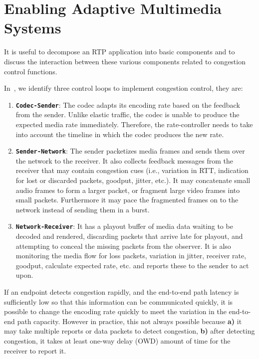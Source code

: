 \section{Enabling Adaptive Multimedia Systems}
\label{fw.amusys}


It is useful to decompose an RTP application into basic components and to
discuss the interaction between these various components related to congestion
control functions. 


In~\cite{Singh:control.loops.api}, we identify three control loops to
implement congestion control, they are:

\begin{enumerate}
\setlength{\itemsep}{0pt}

\item \textbf{\texttt{Codec-Sender}}: The codec adapts its encoding rate based
on the feedback from the sender. Unlike elastic traffic, the codec is unable
to produce the expected media rate immediately. Therefore, the rate-controller
needs to take into account the timeline in which the codec produces the new
rate.

\item \textbf{\texttt{Sender-Network}}: The sender packetizes media frames and
sends them over the network to the receiver. It also collects feedback
messages from the receiver that may contain congestion cues (i.e., variation
in RTT, indication for lost or discarded packets, goodput, jitter, etc.). It
may concatenate small audio frames to form a larger packet, or fragment large
video frames into small packets. Furthermore it may pace the fragmented frames
on to the network instead of sending them in a burst.

\item \textbf{\texttt{Network-Receiver}}: It has a playout buffer of media
data waiting to be decoded and rendered, discarding packets that arrive late
for playout, and attempting to conceal the missing packets from the observer.
It is  also monitoring the media flow for loss packets, variation in jitter,
receiver rate, goodput, calculate expected rate, etc. and reports these to the
sender to act upon.

\end{enumerate}

If an endpoint detects congestion rapidly, and the end-to-end path latency is
sufficiently low so that this information can be communicated quickly, it is
possible to change the encoding rate quickly to meet the variation in the 
end-to-end path capacity. However in practice, this not always possible because
\textbf{a)} it may take multiple reports or data packets to detect congestion,
\textbf{b)} after detecting congestion, it takes at least one-way delay (OWD)
amount of time for the receiver to report it.



